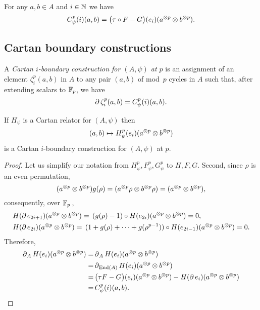 \begin{lemma}
	For any $a,b \in A$ and $i \in \mathbb{N}$ we have
	\[
	C^p_\psi(i)(a,b) =
	\big(\tau \mathbin{\circ} F - G\big)(e_i)(a^{\otimes p} \otimes b^{\otimes p}).
	\]
\end{lemma}

\subsection{Cartan boundary constructions}\label{ss:cartan_coboundary}

A \textit{Cartan $i$-boundary construction for $(A,\psi)$ at $p$} is an assignment of an element $\zeta_i^p(a,b)$ in $A$ to any pair $(a,b)$ of mod~$p$ cycles in $A$ such that, after extending scalars to ${\mathbb{F}_p}$, we have
\[
\operatorname{\partial} \zeta_i^p(a,b) = C_\psi^p(i)(a, b).
\]

\begin{theorem}
	If $H_\psi$ is a Cartan relator for $(A, \psi)$ then
	\[
	(a,b) \mapsto H_\psi^p(e_i)(a^{\otimes p} \otimes b^{\otimes p})
	\]
	is a Cartan $i$-boundary construction for $(A, \psi)$ at $p$.
\end{theorem}

\begin{proof}
	Let us simplify our notation from $H_\psi^p, F_\psi^p, G_\psi^p$ to $H, F, G$.
	Second, since $\rho$ is an even permutation,
	\[
	(a^{\otimes p} \otimes b^{\otimes p}) g(\rho) = (a^{\otimes p} \rho \otimes b^{\otimes p} \rho ) = (a^{\otimes p} \otimes b^{\otimes p}),
	\]
	consequently, over ${\mathbb{F}_p}$\,,
	\begin{align*}
		&H(\operatorname{\partial} e_{2i+1})(a^{\otimes p} \otimes b^{\otimes p}) =\,
		(g(\rho) - 1) \mathbin{\circ} H(e_{2i})(a^{\otimes p} \otimes b^{\otimes p}) = 0, \\
		&H(\operatorname{\partial} e_{2i})(a^{\otimes p} \otimes b^{\otimes p}) =\,
		(1+g(\rho)+\dots+g(\rho^{p-1})) \mathbin{\circ} H(e_{2i-1})(a^{\otimes p} \otimes b^{\otimes p}) = 0.
	\end{align*}
	Therefore,
	\begin{align*}
		\operatorname{\partial}_A H(e_i)(a^{\otimes p} \otimes b^{\otimes p}) =&
		\operatorname{\partial}_A H(e_i)(a^{\otimes p} \otimes b^{\otimes p}) \\ =&
		\operatorname{\partial}_{\mathrm{End}(A)} H(e_i)(a^{\otimes p} \otimes b^{\otimes p}) \\ =& \,
		\big(\tau F - G\big)(e_i)(a^{\otimes p} \otimes b^{\otimes p}) -
		H(\operatorname{\partial} e_i)(a^{\otimes p} \otimes b^{\otimes p}) \\ =&\,
		C^p_\psi(i)(a,b).\qedhere
	\end{align*}
\end{proof}